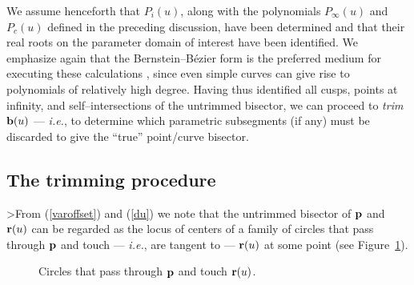 
We assume henceforth that $P_i(u)$, along with the polynomials
$P_\infty(u)$ and $P_c(u)$ defined in the preceding discussion,
have been determined and that their real roots on the parameter
domain of interest have been identified. We emphasize again that
the Bernstein--B\'ezier form is the preferred medium for executing
these calculations \cite{farouki91a}, since even simple curves can
give rise to polynomials of relatively high degree. Having thus
identified all cusps, points at infinity, and self--intersections
of the untrimmed bisector, we can proceed to {\it trim\/} ${\bf b}
(u)$ --- {\it i.e.}, to determine which parametric subsegments (if
any) must be discarded to give the ``true'' point/curve bisector.

\subsection{The trimming procedure}

>From (\ref{varoffset}) and (\ref{du}) we note that the untrimmed
bisector of ${\bf p}$ and ${\bf r}(u)$ can be regarded as the locus
of centers of a family of circles that pass through ${\bf p}$ and
touch --- {\it i.e.}, are tangent to --- ${\bf r}(u)$ at some point
(see Figure~\ref{fig:circles}).

\begin{figure}[htbp] \vspace{3.9in}
\caption[]{Circles that pass through ${\bf p}$ and touch ${\bf r}(u)$.}
\label{fig:circles} \end{figure}

